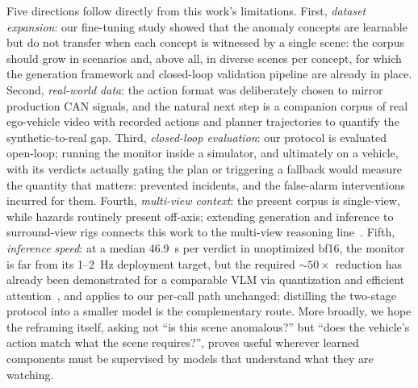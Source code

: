 \documentclass[conference]{IEEEtran}
\begin{document}
Five directions follow directly from this work's limitations. First, \emph{dataset expansion}: our fine-tuning study showed that the anomaly concepts are learnable but do not transfer when each concept is witnessed by a single scene: the corpus should grow in scenarios and, above all, in diverse scenes per concept, for which the generation framework and closed-loop validation pipeline are already in place. Second, \emph{real-world data}: the action format was deliberately chosen to mirror production CAN signals, and the natural next step is a companion corpus of real ego-vehicle video with recorded actions and planner trajectories to quantify the synthetic-to-real gap. Third, \emph{closed-loop evaluation}: our protocol is evaluated open-loop; running the monitor inside a simulator, and ultimately on a vehicle, with its verdicts actually gating the plan or triggering a fallback would measure the quantity that matters: prevented incidents, and the false-alarm interventions incurred for them. Fourth, \emph{multi-view context}: the present corpus is single-view, while hazards routinely present off-axis; extending generation and inference to surround-view rigs connects this work to the multi-view reasoning line~\cite{b14,b15,b16,b17,b18}. Fifth, \emph{inference speed}: at a median 46.9~s per verdict in unoptimized bf16, the monitor is far from its 1--2~Hz deployment target, but the required ${\sim}50\times$ reduction has already been demonstrated for a comparable VLM via quantization and efficient attention~\cite{b13}, and applies to our per-call path unchanged; distilling the two-stage protocol into a smaller model is the complementary route. More broadly, we hope the reframing itself, asking not ``is this scene anomalous?'' but ``does the vehicle's action match what the scene requires?'', proves useful wherever learned components must be supervised by models that understand what they are watching.
\end{document}
